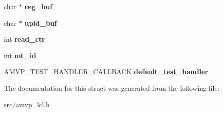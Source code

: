 \begin{DoxyCompactItemize}
\item 
\hypertarget{structamvp__ctx__t_a26080ede47d3db4ab38b070f7037afa8}{char $\ast$ {\bfseries reg\-\_\-buf}}\label{structamvp__ctx__t_a26080ede47d3db4ab38b070f7037afa8}

\item 
\hypertarget{structamvp__ctx__t_a05c536736b5912d3ddb5e8787c8905ca}{char $\ast$ {\bfseries upld\-\_\-buf}}\label{structamvp__ctx__t_a05c536736b5912d3ddb5e8787c8905ca}

\item 
\hypertarget{structamvp__ctx__t_a76007f3d4fe20552cf7a402221b1f9e8}{int {\bfseries read\-\_\-ctr}}\label{structamvp__ctx__t_a76007f3d4fe20552cf7a402221b1f9e8}

\item 
\hypertarget{structamvp__ctx__t_aed4f239b65fb63b744625d5d858d1f31}{int {\bfseries mt\-\_\-id}}\label{structamvp__ctx__t_aed4f239b65fb63b744625d5d858d1f31}

\item 
\hypertarget{structamvp__ctx__t_a79e5e3f3659c8a9a49f957b6f9685e7f}{A\-M\-V\-P\-\_\-\-T\-E\-S\-T\-\_\-\-H\-A\-N\-D\-L\-E\-R\-\_\-\-C\-A\-L\-L\-B\-A\-C\-K {\bfseries default\-\_\-test\-\_\-handler}}\label{structamvp__ctx__t_a79e5e3f3659c8a9a49f957b6f9685e7f}

\end{DoxyCompactItemize}


The documentation for this struct was generated from the following file\-:\begin{DoxyCompactItemize}
\item 
src/amvp\-\_\-lcl.\-h\end{DoxyCompactItemize}
